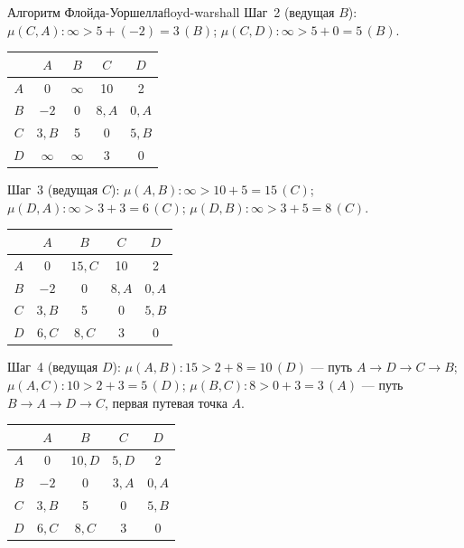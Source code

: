 \begin{algo}{Алгоритм Флойда-Уоршелла}{floyd-warshall}
Шаг~2 (ведущая $B$): $\mu(C,A)\colon \infty > 5+(-2) = 3\,(B)$; $\mu(C,D)\colon \infty > 5+0 = 5\,(B)$.
\begin{center}
\begin{tabular}{c|cccc}
     & $A$      & $B$      & $C$      & $D$      \\
\hline
$A$  & 0        & $\infty$ & 10       & 2        \\
$B$  & $-2$     & 0        & $8, A$   & $0, A$   \\
$C$  & $3, B$   & 5        & 0        & $5, B$   \\
$D$  & $\infty$ & $\infty$ & 3        & 0        \\
\end{tabular}
\end{center}

Шаг~3 (ведущая $C$): $\mu(A,B)\colon \infty > 10+5 = 15\,(C)$; $\mu(D,A)\colon \infty > 3+3 = 6\,(C)$; $\mu(D,B)\colon \infty > 3+5 = 8\,(C)$.
\begin{center}
\begin{tabular}{c|cccc}
     & $A$      & $B$      & $C$      & $D$      \\
\hline
$A$  & 0        & $15, C$  & 10       & 2        \\
$B$  & $-2$     & 0        & $8, A$   & $0, A$   \\
$C$  & $3, B$   & 5        & 0        & $5, B$   \\
$D$  & $6, C$   & $8, C$   & 3        & 0        \\
\end{tabular}
\end{center}

Шаг~4 (ведущая $D$): $\mu(A,B)\colon 15 > 2 + 8 = 10\,(D)$ --- путь $A \to D \to C \to B$; $\mu(A,C)\colon 10 > 2+3 = 5\,(D)$; $\mu(B,C)\colon 8 > 0+3 = 3\,(A)$ --- путь $B \to A \to D \to C$, первая путевая точка $A$.
\begin{center}
\begin{tabular}{c|cccc}
     & $A$      & $B$      & $C$      & $D$      \\
\hline
$A$  & 0        & $10, D$  & $5, D$   & 2        \\
$B$  & $-2$     & 0        & $3, A$   & $0, A$   \\
$C$  & $3, B$   & 5        & 0        & $5, B$   \\
$D$  & $6, C$   & $8, C$   & 3        & 0        \\
\end{tabular}
\end{center}


\end{algo}

